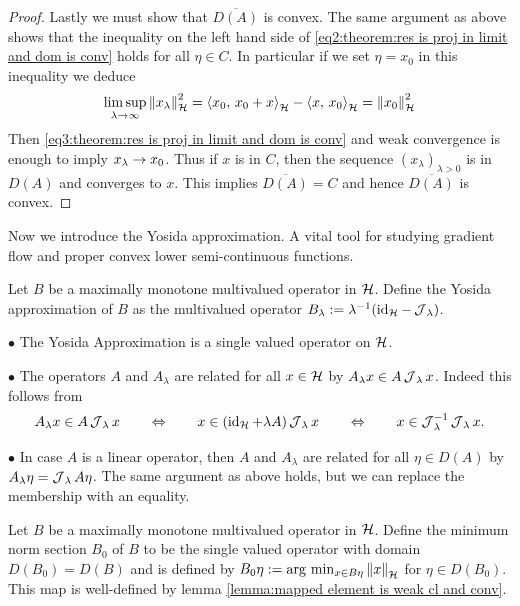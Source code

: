\begin{proof}
	Lastly we must show that $ \overline{D(A)} $ is convex. 
	The same argument as above shows that the inequality on the 
	left hand side of \eqref{eq2:theorem:res is proj in limit and dom is conv}
	holds for all $ \eta\in C $. In particular if we set $ \eta=x_0 $
	in this inequality we deduce
	\begin{align}\label{eq3:theorem:res is proj in limit and dom is conv}
		\limsup_{\lambda \rightarrow \infty}\left\Vert x_\lambda\right\Vert_{\mathcal{H}}^2
		= \left\langle x_0,\,x_0+x\right\rangle_{\mathcal{H}}-\left\langle x,\,x_0\right\rangle_{\mathcal{H}}
		= \left\Vert x_0\right\Vert_{\mathcal{H}}^2
	\end{align}
	Then \eqref{eq3:theorem:res is proj in limit and dom is conv}
	 and weak convergence is enough to imply $ x_\lambda \rightarrow x_0 $.
	 Thus if $ x$ is in $ C $, then the sequence $ (x_\lambda)_{\lambda>0} $
	 is in $ D(A) $ and converges to $ x $. This implies $ \overline{D(A)}=C $
	 and hence $ \overline{D(A)} $ is convex.
\end{proof}

Now we introduce the Yosida approximation. A vital tool for
studying gradient flow and proper convex lower semi-continuous functions.

\begin{definition}\label{definition:Yosida Approximation}
	Let $ B $ be a maximally monotone multivalued operator in $ \mathcal{H} $. 
	Define the Yosida approximation of $ B $ as the multivalued operator 
	$ B_\lambda:=\lambda^{-1}(\operatorname{\mathrm{id}}_{\mathcal{H}}-\operatorname{\mathcal{J}}_\lambda) $.
\end{definition}

\begin{remark}\label{remark:triv prop yos app}
	$ \bullet $ The Yosida Approximation is a single valued operator on $ \mathcal{H} $.
	\medskip
	
	$ \bullet $ The operators $ A $ and $ A_\lambda $ are 
	related for all $ x\in \mathcal{H} $ by 
	$ A_\lambda x \in A \operatorname{\mathcal{J}}_\lambda x $. Indeed 
	this follows from
	\begin{align*}
		A_\lambda x\in A\operatorname{\mathcal{J}}_\lambda x
		\qquad\Leftrightarrow\qquad
		x\in (\operatorname{\mathrm{id}}_{\mathcal{H}}+\lambda A)\operatorname{\mathcal{J}}_\lambda x 
		\qquad\Leftrightarrow\qquad
		x\in \operatorname{\mathcal{J}}_\lambda^{-1}\operatorname{\mathcal{J}}_\lambda x.
	\end{align*}
	
	$ \bullet $ In case $ A $ is a linear operator, then  
	$ A $ and $ A_\lambda $ are related for all 
	$ \eta\in D(A) $ by $ A_\lambda \eta=\operatorname{\mathcal{J}}_\lambda A\eta $.
	The same argument as above holds, but we can replace the membership
	with an equality.
\end{remark}

\begin{definition}
	Let $ B $ be a maximally monotone multivalued operator in $ \mathcal{H} $. Define the 
	minimum norm section $ B_0 $ of $ B $ to be the single valued operator with
	domain $ D(B_0)=D(B) $ and is defined by
	$ B_0 \eta := \arg\,\min_{x\in B\eta}\left\Vert x\right\Vert_{\mathcal{H}} $ for $ \eta\in D(B_0) $.
	This map is well-defined by lemma 
	\ref{lemma:mapped element is weak cl and conv}.
\end{definition}

